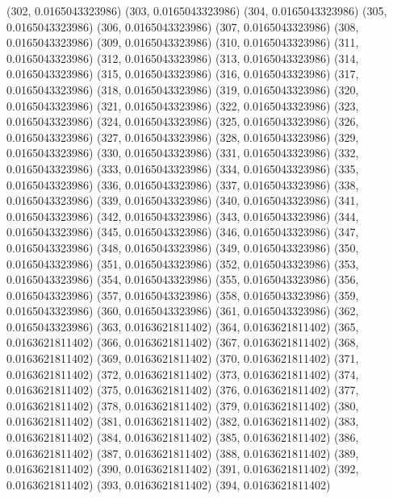 {					(302, 0.0165043323986)
					(303, 0.0165043323986)
					(304, 0.0165043323986)
					(305, 0.0165043323986)
					(306, 0.0165043323986)
					(307, 0.0165043323986)
					(308, 0.0165043323986)
					(309, 0.0165043323986)
					(310, 0.0165043323986)
					(311, 0.0165043323986)
					(312, 0.0165043323986)
					(313, 0.0165043323986)
					(314, 0.0165043323986)
					(315, 0.0165043323986)
					(316, 0.0165043323986)
					(317, 0.0165043323986)
					(318, 0.0165043323986)
					(319, 0.0165043323986)
					(320, 0.0165043323986)
					(321, 0.0165043323986)
					(322, 0.0165043323986)
					(323, 0.0165043323986)
					(324, 0.0165043323986)
					(325, 0.0165043323986)
					(326, 0.0165043323986)
					(327, 0.0165043323986)
					(328, 0.0165043323986)
					(329, 0.0165043323986)
					(330, 0.0165043323986)
					(331, 0.0165043323986)
					(332, 0.0165043323986)
					(333, 0.0165043323986)
					(334, 0.0165043323986)
					(335, 0.0165043323986)
					(336, 0.0165043323986)
					(337, 0.0165043323986)
					(338, 0.0165043323986)
					(339, 0.0165043323986)
					(340, 0.0165043323986)
					(341, 0.0165043323986)
					(342, 0.0165043323986)
					(343, 0.0165043323986)
					(344, 0.0165043323986)
					(345, 0.0165043323986)
					(346, 0.0165043323986)
					(347, 0.0165043323986)
					(348, 0.0165043323986)
					(349, 0.0165043323986)
					(350, 0.0165043323986)
					(351, 0.0165043323986)
					(352, 0.0165043323986)
					(353, 0.0165043323986)
					(354, 0.0165043323986)
					(355, 0.0165043323986)
					(356, 0.0165043323986)
					(357, 0.0165043323986)
					(358, 0.0165043323986)
					(359, 0.0165043323986)
					(360, 0.0165043323986)
					(361, 0.0165043323986)
					(362, 0.0165043323986)
					(363, 0.0163621811402)
					(364, 0.0163621811402)
					(365, 0.0163621811402)
					(366, 0.0163621811402)
					(367, 0.0163621811402)
					(368, 0.0163621811402)
					(369, 0.0163621811402)
					(370, 0.0163621811402)
					(371, 0.0163621811402)
					(372, 0.0163621811402)
					(373, 0.0163621811402)
					(374, 0.0163621811402)
					(375, 0.0163621811402)
					(376, 0.0163621811402)
					(377, 0.0163621811402)
					(378, 0.0163621811402)
					(379, 0.0163621811402)
					(380, 0.0163621811402)
					(381, 0.0163621811402)
					(382, 0.0163621811402)
					(383, 0.0163621811402)
					(384, 0.0163621811402)
					(385, 0.0163621811402)
					(386, 0.0163621811402)
					(387, 0.0163621811402)
					(388, 0.0163621811402)
					(389, 0.0163621811402)
					(390, 0.0163621811402)
					(391, 0.0163621811402)
					(392, 0.0163621811402)
					(393, 0.0163621811402)
					(394, 0.0163621811402)
}
